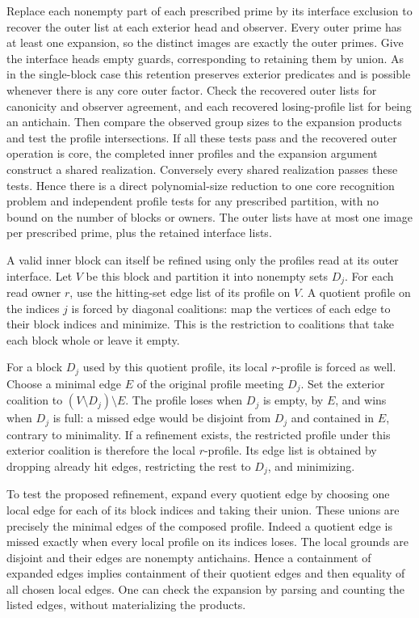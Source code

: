 Replace each nonempty part of each prescribed prime by its
interface exclusion to recover the outer list at each exterior
head and observer. Every outer prime has at least one expansion,
so the distinct images are exactly the outer primes. Give the
interface heads empty guards, corresponding to retaining them
by union. As in the single-block case this retention preserves
exterior predicates and is possible whenever there is any core
outer factor. Check the recovered outer lists for canonicity and
observer agreement, and each recovered losing-profile list for
being an antichain. Then compare the observed group sizes to the
expansion products and test the profile intersections. If all
these tests pass and the recovered outer operation is core, the
completed inner profiles and the expansion argument construct
a shared realization. Conversely every shared realization passes
these tests. Hence there is a direct polynomial-size reduction
to one core recognition problem and independent profile tests
for any prescribed partition, with no bound on the number of
blocks or owners. The outer lists have at most one image per
prescribed prime, plus the retained interface lists.

A valid inner block can itself be refined using only the profiles
read at its outer interface. Let $V$ be this block and partition
it into nonempty sets $D_j$. For each read owner $r$, use the
hitting-set edge list of its profile on $V$. A quotient profile
on the indices $j$ is forced by diagonal coalitions: map the
vertices of each edge to their block indices and minimize. This
is the restriction to coalitions that take each block whole or
leave it empty.

For a block $D_j$ used by this quotient profile, its local
$r$-profile is forced as well. Choose a minimal edge $E$ of
the original profile meeting $D_j$. Set the exterior coalition
to $(V\setminus D_j)\setminus E$. The profile loses when $D_j$
is empty, by $E$, and wins when $D_j$ is full: a missed edge
would be disjoint from $D_j$ and contained in $E$, contrary
to minimality. If a refinement exists, the restricted profile
under this exterior coalition is therefore the local $r$-profile.
Its edge list is obtained by dropping already hit edges,
restricting the rest to $D_j$, and minimizing.

To test the proposed refinement, expand every quotient edge by
choosing one local edge for each of its block indices and taking
their union. These unions are precisely the minimal edges of
the composed profile. Indeed a quotient edge is missed exactly
when every local profile on its indices loses. The local grounds
are disjoint and their edges are nonempty antichains. Hence a
containment of expanded edges implies containment of their
quotient edges and then equality of all chosen local edges.
One can check the expansion by parsing and counting the listed
edges, without materializing the products.

